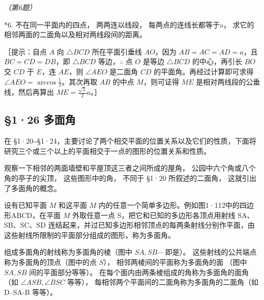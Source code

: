 \emph{（第6题）}

*6. 不在同一平面内的四点， 两两连以线段， 每两点的连线长都等于a，
求它的相邻两面的二面角以及相对两线段间的距离。

［提示：自点 \(A\) 向 \(\triangle BCD\) 所在平面引垂线 \(AO\)，因为
\(AB = AC = AD = a\)，且 \(BC = CD = DB\)，即 \(\triangle BCD\)
等边，\(\therefore\) 点 \(O\) 是等边 \(\triangle BCD\) 的中心，再引长
\(BO\) 交 \(CD\) 于 \(E\)，连 \(AE\)，则 \(\angle AEO\) 是二面角 \(CD\)
的平面角。再经过计算即可求得
\(\angle AEO = \arccos \frac{1}{3}\)。其次再取 \(AB\) 的中点
\(M\)，则可证得 \(ME\) 是相对两线段的公垂线，然后再算出
\(ME = \frac{\sqrt{2}}{2} a\)。］

\subsection{§1·26 多面角}

在
§1·20\textasciitilde§1·24，主要讨论了两个相交平面的位置关系以及它们的性质，下面将研究三个或三个以上的平面相交于一点的图形的位置关系和性质。

观察一下相邻的两面墙壁和平屋顶这三者之间所成的屋角，
公园中六个角或八个角的亭子的尖顶， 这些图形中的角， 不同于 §1·20
所叙述的二面角， 这就引出了多面角的概念。

设有已知平面 \(M\) 和这平面 \(M\)
内的任意一个简单多边形。例如图1·112中的四边形ABCD，在平面 \(M\)
外取任意一点 S，把它和已知的多边形各顶点用射线 SA、SB、SC、SD
连结起来，并过已知多边形相邻顶点的每两条射线分别作平面，由这些射线所限制的平面部分组成的图形，称为多面角。

组成多面角的射线称为多面角的棱（图中 \(SA, SB \cdots\) 即是）。
这些射线的公共端点称为多面角的顶点（图中的点 \(S\)），
相邻两棱间的平面称为多面角的面 （图中 \(SA, SB\) 间的平面部分等等）。
在每个面内由两条棱组成的角称为多面角的面角 （如
\(\angle ASB, \angle BSC\) 等等），
每相邻两个平面间的二面角称为多面角的二面角（如 D--SA-B 等等）。

